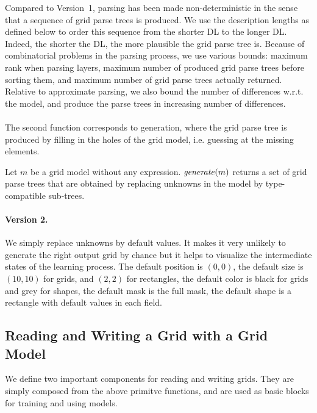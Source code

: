 \documentclass[a4paper]{llncs}
\begin{document}
Compared to Version~1, parsing has been made non-deterministic in the
sense that a sequence of grid parse trees is produced. We use the
description lengths as defined below to order this sequence from the
shorter DL to the longer DL. Indeed, the shorter the DL, the more
plausible the grid parse tree is. Because of combinatorial problems in
the parsing process, we use various bounds: maximum rank when parsing
layers, maximum number of produced grid parse trees before sorting
them, and maximum number of grid parse trees actually
returned. Relative to approximate parsing, we also bound the number of
differences w.r.t. the model, and produce the parse trees in
increasing number of differences.

\paragraph{}
The second function corresponds to generation, where the grid parse
tree is produced by filling in the holes of the grid model,
i.e. guessing at the missing elements.

\begin{definition}
  Let $m$ be a grid model without any expression. ${\it generate}(m)$
  returns a set of grid parse trees that are obtained by replacing
  unknowns in the model by type-compatible sub-trees.
\end{definition}

\paragraph{Version 2.} We simply replace unknowns by default
values. It makes it very unlikely to generate the right output grid by
chance but it helps to visualize the intermediate states of the
learning process. The default position is $(0,0)$, the default size is
$(10,10)$ for grids, and $(2,2)$ for rectangles, the default color is
black for grids and grey for shapes, the default mask is the full
mask, the default shape is a rectangle with default values in each
field.


\subsection{Reading and Writing a Grid with a Grid Model}
\label{read:write}

We define two important components for reading and writing grids.
They are simply composed from the above primitve functions, and are
used as basic blocks for training and using models.
\end{document}
